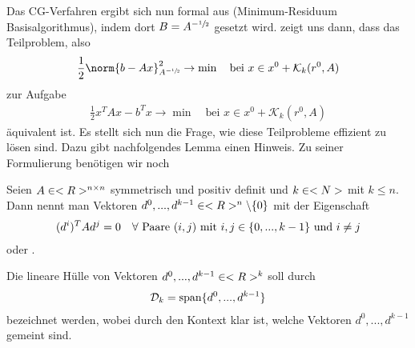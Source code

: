 Das CG-Verfahren ergibt sich nun formal aus  (Minimum-Residuum Basisalgorithmus), indem dort $B=A^{-\sfrac{1}{2}}$ gesetzt wird.  zeigt uns dann, dass das Teilproblem, also
\begin{align}
	\label{2_13}
	\frac{1}{2}\norm{b-Ax}^2_{A^{-\sfrac{1}{2}}}\to\min\quad\text{bei } x\in x^0+\mathcal{K}_k(r^0,A)
\end{align}
zur Aufgabe
\begin{align}
	\label{2_14}
	\frac{1}{2}x^TAx-b^Tx\to\min\quad\text{bei } x\in x^0+\mathcal{K}_k(r^0,A)
\end{align}
äquivalent ist. Es stellt sich nun die Frage, wie diese Teilprobleme effizient zu lösen sind. Dazu gibt nachfolgendes Lemma einen Hinweis. Zu seiner Formulierung benötigen wir noch

\begin{definition}
	Seien $A\in<R>^{n \times n}$ symmetrisch und positiv definit und $k\in<N>$ mit $k\le n$. Dann nennt man Vektoren $d^0,...,d^{k-1}\in<R>^n\backslash\{0\}$ mit der Eigenschaft
	\begin{align}
		(d^i)^TAd^j=0\quad\forall\text{ Paare } (i,j) \text{ mit } i,j\in\{0,...,k-1\} \text{ und } i\neq j\notag
	\end{align}
	 oder .
\end{definition}

Die lineare Hülle von Vektoren $d^0,...,d^{k-1}\in<R>^k$ soll durch 
\begin{align}
	\mathcal{D}_k=\operatorname{span}\{d^0,...,d^{k-1}\}\notag
\end{align}
bezeichnet werden, wobei durch den Kontext klar ist, welche Vektoren $d^0,...,d^{k-1}$ gemeint sind.

